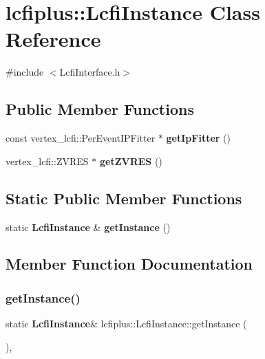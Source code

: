 \section{lcfiplus\+:\+:Lcfi\+Instance Class Reference}
\label{classlcfiplus_1_1LcfiInstance}


{\ttfamily \#include $<$Lcfi\+Interface.\+h$>$}

\subsection*{Public Member Functions}
\begin{DoxyCompactItemize}
\item 
const vertex\+\_\+lcfi\+::\+Per\+Event\+I\+P\+Fitter $\ast$ \textbf{ get\+Ip\+Fitter} ()
\item 
vertex\+\_\+lcfi\+::\+Z\+V\+R\+ES $\ast$ \textbf{ get\+Z\+V\+R\+ES} ()
\end{DoxyCompactItemize}
\subsection*{Static Public Member Functions}
\begin{DoxyCompactItemize}
\item 
static \textbf{ Lcfi\+Instance} \& \textbf{ get\+Instance} ()
\end{DoxyCompactItemize}


\subsection{Member Function Documentation}
\mbox{\label{classlcfiplus_1_1LcfiInstance_aad409604c646ccfbd374f980ecc4447a}} 
\subsubsection{get\+Instance()}
{\footnotesize\ttfamily static \textbf{ Lcfi\+Instance}\& lcfiplus\+::\+Lcfi\+Instance\+::get\+Instance (\begin{DoxyParamCaption}{ }\end{DoxyParamCaption})\hspace{0.3cm}{\ttfamily [inline]}, {\ttfamily [static]}}



